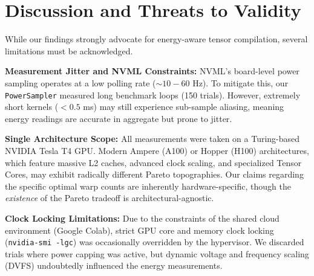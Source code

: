 \section{Discussion and Threats to Validity}
\label{sec:discussion}

While our findings strongly advocate for energy-aware tensor compilation, several limitations must be acknowledged. 

\textbf{Measurement Jitter and NVML Constraints:} NVML's board-level power sampling operates at a low polling rate ($\sim 10-60$ Hz). To mitigate this, our \texttt{PowerSampler} measured long benchmark loops (150 trials). However, extremely short kernels ($<0.5$ ms) may still experience sub-sample aliasing, meaning energy readings are accurate in aggregate but prone to jitter.

\textbf{Single Architecture Scope:} All measurements were taken on a Turing-based NVIDIA Tesla T4 GPU. Modern Ampere (A100) or Hopper (H100) architectures, which feature massive L2 caches, advanced clock scaling, and specialized Tensor Cores, may exhibit radically different Pareto topographies. Our claims regarding the specific optimal warp counts are inherently hardware-specific, though the \textit{existence} of the Pareto tradeoff is architectural-agnostic.

\textbf{Clock Locking Limitations:} Due to the constraints of the shared cloud environment (Google Colab), strict GPU core and memory clock locking (\texttt{nvidia-smi -lgc}) was occasionally overridden by the hypervisor. We discarded trials where power capping was active, but dynamic voltage and frequency scaling (DVFS) undoubtedly influenced the energy measurements.
